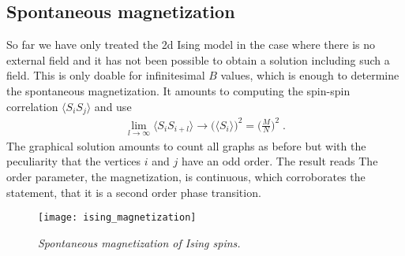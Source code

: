 \subsection{Spontaneous magnetization}
So far we have only treated the 2d Ising model in the case where there is no external field and it has not been possible to obtain a solution including such a field. This is only doable for infinitesimal $B$ values, which is enough to determine the spontaneous 
magnetization. It amounts to computing the spin-spin correlation $\langle S_{i} S_{j}\rangle$ and use
%
\begin{align*}
\lim_{l\to\infty} \langle S_{i}  S_{i+l}\rangle \longrightarrow \bigg(  \langle S_{i} \rangle\bigg)^{2}
= \bigg(\frac{M}{N }\bigg)^{2}\;.
\end{align*}
%
The graphical solution amounts to count all graphs as before but with the peculiarity that 
the vertices $i$ and $j$ have an odd order.
The result reads
The order parameter, the magnetization, is continuous, which corroborates 
the statement, that it is a second order phase transition.
%
\begin{figure}[t]
\begin{center}
\texttt{[image: ising\_magnetization]}
\caption{{\it Spontaneous magnetization of Ising spins.}}
\end{center}
\end{figure}
%

%

